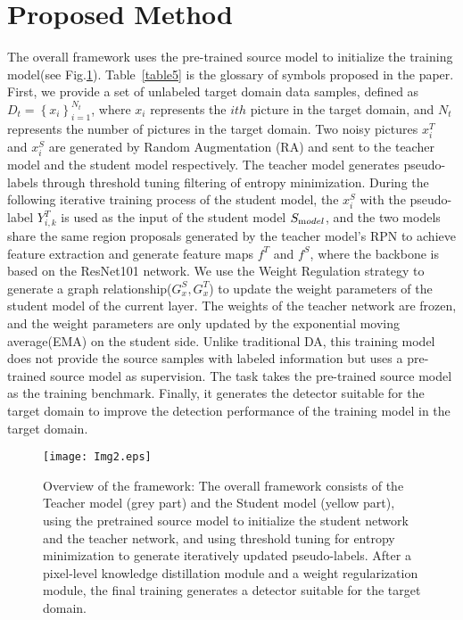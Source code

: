 \documentclass[sn-mathphys]{sn-jnl}%
\theoremstyle{thmstyleone}%
\theoremstyle{thmstyletwo}%
\theoremstyle{thmstylethree}%
\begin{document}
\section{Proposed Method}\label{sec:sec3}
The overall framework uses the pre-trained source model to initialize the training model(see Fig.\ref{fig2}). Table~\ref{table5} is the glossary of symbols proposed in the paper. First, we provide a set of unlabeled target domain data samples, defined as  ${{D}_{t}}=\left\{ {{x}_{i}} \right\}_{i=1}^{{{N}_{t}}}$, where ${{x}_{i}}$ represents the $ith$ picture in the target domain, and ${{N}_{t}}$ represents the number of pictures in the target domain. Two noisy pictures $x_{i}^{T}$ and $x_{i}^{S}$ are generated by Random Augmentation (RA) and sent to the teacher model and the student model respectively. The teacher model generates pseudo-labels through threshold tuning filtering of entropy minimization. During the following iterative training process of the student model, the $x_{i}^{S}$ with the pseudo-label $Y_{i,k}^{T}$ is used as the input of the student model ${{S}_{\text model}}$, and the two models share the same region proposals generated by the teacher model’s RPN to achieve feature extraction and generate feature maps ${{f}^{T}}$ and ${{f}^{S}}$, where the backbone is based on the ResNet101 network. We use the Weight Regulation strategy to generate a graph relationship($G_{x}^{S},G_{x}^{T}$) to update the weight parameters of the student model of the current layer. The weights of the teacher network are frozen, and the weight parameters are only updated by the exponential moving average(EMA) on the student side. Unlike traditional DA, this training model does not provide the source samples with labeled information but uses a pre-trained source model as supervision. The task takes the pre-trained source model as the training benchmark. Finally, it generates the detector suitable for the target domain to improve the detection performance of the training model in the target domain.  



\begin{figure}
	\texttt{[image: Img2.eps]}
	\caption{Overview of the framework: The overall framework consists of the Teacher model (grey part) and the Student model (yellow part), using the pretrained source model to initialize the student network and the teacher network, and using threshold tuning for entropy minimization to generate iteratively updated pseudo-labels. After a pixel-level knowledge distillation module and a weight regularization module, the final training generates a detector suitable for the target domain.} \label{fig2}
\end{figure}
\end{document}
